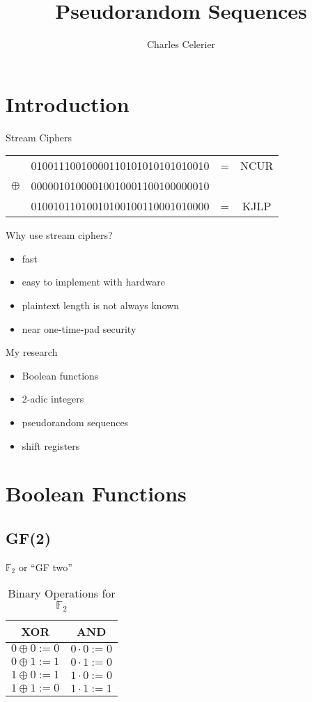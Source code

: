 \documentclass{beamer}
\def\gftwo{\mathbb{F}_2}
\begin{document}
\title{Pseudorandom Sequences}
\author{Charles Celerier}
\frame{\titlepage}
\frame{\tableofcontents}

\section{Introduction}

\begin{frame}{Stream Ciphers}
  \begin{tabular}{c c c c}
              & 01001110010000110101010101010010 & = & NCUR\\
              \pause
     $\oplus$ & 00000101000010010001100100000010 & \\
              \hline 
              \pause
              & 01001011010010100100110001010000 & = & KJLP
  \end{tabular}
\end{frame}

\begin{frame}{Why use stream ciphers?}
  \begin{itemize}
    \item fast
    \item easy to implement with hardware
    \item plaintext length is not always known
    \item near one-time-pad security
  \end{itemize}
\end{frame}

\begin{frame}{My research}
  \begin{itemize}
    \item Boolean functions
    \item 2-adic integers
    \item pseudorandom sequences
    \item shift registers
  \end{itemize}
\end{frame}

\section{Boolean Functions}
\subsection{GF(2)}
\begin{frame}{$\gftwo$ or ``GF two''}
\begin{table}[h!]\label{tab:GF(2)}
	\centering
	\begin{tabular}{|c|c|}
		\hline
		XOR&AND\\
		\hline
		$0\oplus0:=0$&$0\cdot0:=0$\\
		$0\oplus1:=1$&$0\cdot1:=0$\\
		$1\oplus0:=1$&$1\cdot0:=0$\\
		$1\oplus1:=0$&$1\cdot1:=1$\\
		\hline
	\end{tabular}
	\caption{Binary Operations for $\gftwo$}
\end{table}
\end{frame}
\end{document}
